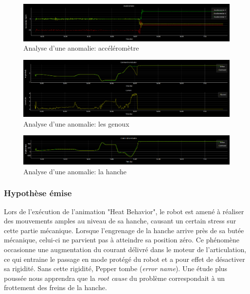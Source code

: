 \begin{figure}[h]
	\centering\includegraphics[width=13cm]{images/analyse_1.png}
	\caption{Analyse d'une anomalie: accéléromètre}
	\label{fig:analyse d'une anomalie: accéléromètre}
\end{figure}

\begin{figure}[h]
	\centering\includegraphics[width=13cm]{images/analyse_2.png}
	\caption{Analyse d'une anomalie: les genoux}
	\label{fig:analyse d'une anomalie: kneePitch}
\end{figure}

\begin{figure}[h]
	\centering\includegraphics[width=13cm]{images/analyse_3.png}
	\caption{Analyse d'une anomalie: la hanche}
	\label{fig:analyse d'une anomalie: hipitch}
\end{figure}

\subsubsection{Hypothèse émise}
 Lors de l'exécution de l'animation "Heat Behavior", le robot est amené à réaliser des mouvements amples au niveau de sa hanche, causant un certain stress sur cette partie mécanique. Lorsque l'engrenage de la hanche arrive près de sa butée mécanique, celui-ci ne parvient pas à atteindre sa position zéro. Ce phénomène occasionne une augmentation du courant délivré dans le moteur de l'articulation, ce qui entraine le passage en mode protégé du robot et a pour effet de désactiver sa rigidité. Sans cette rigidité, Pepper tombe (\emph{error name}). Une étude plus poussée nous apprendra que la\emph{ root cause } du problème correspondait à un frottement des freins de la hanche. 


